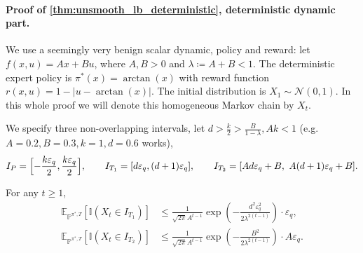 \documentclass{article}
\let\oldparagraph\paragraph
\renewcommand{\paragraph}[1]{\oldparagraph{#1.}}
\begin{document}
\paragraph{Proof of \cref{thm:unsmooth_lb_deterministic}, deterministic dynamic part}

We use a seemingly very benign scalar dynamic, policy and reward: let
$f(x,u)=Ax+Bu$, where $A,B>0$ and $\lambda\coloneqq A+B<1$.
The deterministic expert policy is $\pi^*(x)=\arctan(x)$ with reward function
$r(x,u)=1-|u-\arctan(x)|$.
The initial distribution is $X_1 \sim \mathcal N(0,1).$ In this whole proof we will denote this homogeneous Markov chain by $X_t$.

We specify three non-overlapping intervals, let $d>\frac{k}{2}>\frac{B}{1-\lambda}, Ak<1$ (e.g. $A=0.2, B=0.3, k=1,d=0.6$ works), 
\begin{align*}
I_P=\Bigl[-\frac{k\varepsilon_q}{2},\frac{k\varepsilon_q}{2}\Bigr],\qquad
I_{T_1}=[d\varepsilon_q, (d+1)\varepsilon_q],\qquad
I_{T_2}=[Ad\varepsilon_q+B,\ A(d+1)\varepsilon_q+B].
\end{align*}

\begin{claim}
For any $t\ge 1$,
\begin{align*}
\mathbb E_{\mathbb P^{\pi^*, T}}[\mathbb I(X_t\in I_{T_1})]
&\leq \frac{1}{\sqrt {2\pi}A^{t-1}}
\exp\left(-\frac{d^2\varepsilon_q^2}{2 \lambda^{2(t-1)}}\right)\cdot\varepsilon_q,\\
\mathbb E_{\mathbb P^{\pi^*, T}}[\mathbb I(X_t\in I_{T_2})]
&\leq \frac{1}{\sqrt {2\pi}A^{t-1}}
\exp\left(-\frac{B^2}{2\lambda^{2(t-1)}}\right)\cdot A\varepsilon_q.
\end{align*}
\end{claim}
\end{document}
